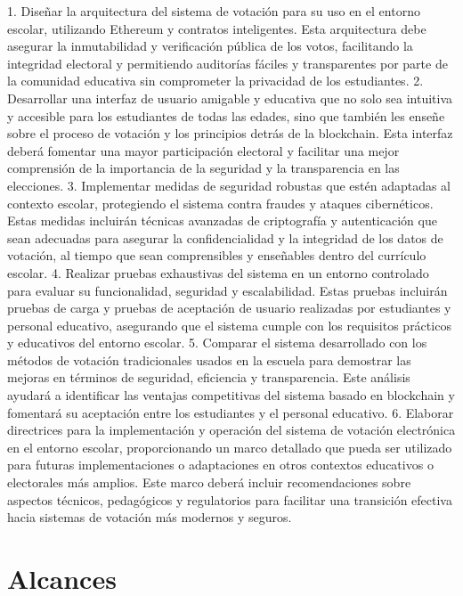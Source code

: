 \documentclass{report}
\begin{document}
	1. Diseñar la arquitectura del sistema de votación para su uso en el entorno escolar, utilizando Ethereum y contratos inteligentes. Esta arquitectura debe asegurar la inmutabilidad y verificación pública de los votos, facilitando la integridad electoral y permitiendo auditorías fáciles y transparentes por parte de la comunidad educativa sin comprometer la privacidad de los estudiantes.
	2. Desarrollar una interfaz de usuario amigable y educativa que no solo sea intuitiva y accesible para los estudiantes de todas las edades, sino que también les enseñe sobre el proceso de votación y los principios detrás de la blockchain. Esta interfaz deberá fomentar una mayor participación electoral y facilitar una mejor comprensión de la importancia de la seguridad y la transparencia en las elecciones.
	3. Implementar medidas de seguridad robustas que estén adaptadas al contexto escolar, protegiendo el sistema contra fraudes y ataques cibernéticos. Estas medidas incluirán técnicas avanzadas de criptografía y autenticación que sean adecuadas para asegurar la confidencialidad y la integridad de los datos de votación, al tiempo que sean comprensibles y enseñables dentro del currículo escolar.
	4. Realizar pruebas exhaustivas del sistema en un entorno controlado para evaluar su funcionalidad, seguridad y escalabilidad. Estas pruebas incluirán pruebas de carga y pruebas de aceptación de usuario realizadas por estudiantes y personal educativo, asegurando que el sistema cumple con los requisitos prácticos y educativos del entorno escolar.
	5. Comparar el sistema desarrollado con los métodos de votación tradicionales usados en la escuela para demostrar las mejoras en términos de seguridad, eficiencia y transparencia. Este análisis ayudará a identificar las ventajas competitivas del sistema basado en blockchain y fomentará su aceptación entre los estudiantes y el personal educativo.
	6. Elaborar directrices para la implementación y operación del sistema de votación electrónica en el entorno escolar, proporcionando un marco detallado que pueda ser utilizado para futuras implementaciones o adaptaciones en otros contextos educativos o electorales más amplios. Este marco deberá incluir recomendaciones sobre aspectos técnicos, pedagógicos y regulatorios para facilitar una transición efectiva hacia sistemas de votación más modernos y seguros.
	
	\section{Alcances}
	
\end{document}
